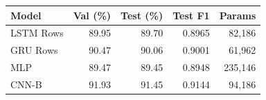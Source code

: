 \begin{tabular}{lrrrr}
\toprule
Model & Val (\%) & Test (\%) & Test F1 & Params\\
\midrule
LSTM Rows & 89.95 & 89.70 & 0.8965 & 82,186\\
GRU Rows & 90.47 & 90.06 & 0.9001 & 61,962\\
MLP & 89.47 & 89.45 & 0.8948 & 235,146\\
CNN-B & 91.93 & 91.45 & 0.9144 & 94,186\\
\bottomrule
\end{tabular}
